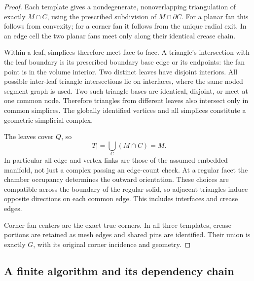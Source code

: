 \documentclass[11pt]{article}
\theoremstyle{definition}
\theoremstyle{remark}
\begin{document}
\begin{proof}
Each template gives a nondegenerate, nonoverlapping triangulation of
exactly $M\cap C$, using the prescribed subdivision of
$M\cap\partial C$. For a planar fan this follows from convexity;
for a corner fan it follows from the unique radial exit. In an edge
cell the two planar fans meet only along their identical crease chain.

Within a leaf, simplices therefore meet face-to-face. A triangle's
intersection with the leaf boundary is its prescribed boundary base
edge or its endpoints: the fan point is in the volume interior.
Two distinct leaves have disjoint interiors. All possible
inter-leaf triangle intersections lie on interfaces, where the
same noded segment graph is used. Two such triangle bases are
identical, disjoint, or meet at one common node. Therefore triangles
from different leaves also intersect only in common simplices.
The globally identified vertices and all simplices constitute a
geometric simplicial complex.

The leaves cover $Q$, so
\[
  |T|=\bigcup_C(M\cap C)=M.
\]
In particular all edge and vertex links are those of the assumed
embedded manifold, not just a complex passing an edge-count check.
At a regular facet the chamber occupancy determines the outward
orientation. These choices are compatible across the boundary of
the regular solid, so adjacent triangles induce opposite directions
on each common edge. This includes interfaces and crease edges.

Corner fan centers are the exact true corners. In all three
templates, crease portions are retained as mesh edges and shared
pins are identified. Their union is exactly $G$, with its original
corner incidence and geometry.
\end{proof}

\subsection{A finite algorithm and its dependency chain}
\end{document}
